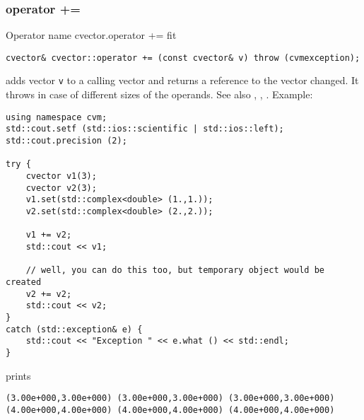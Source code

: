 \subsubsection{operator +=}
Operator%
\pdfdest name {cvector.operator +=} fit
\begin{verbatim}
cvector& cvector::operator += (const cvector& v) throw (cvmexception);
\end{verbatim}
adds vector \verb"v" to a calling vector 
and returns a reference to
the vector changed.
It throws  
in case of different sizes of the operands.
See also ,
,
.
Example:
\begin{Verbatim}
using namespace cvm;
std::cout.setf (std::ios::scientific | std::ios::left);
std::cout.precision (2);

try {
    cvector v1(3);
    cvector v2(3);
    v1.set(std::complex<double> (1.,1.));
    v2.set(std::complex<double> (2.,2.));

    v1 += v2;
    std::cout << v1;

    // well, you can do this too, but temporary object would be created
    v2 += v2;
    std::cout << v2;
}
catch (std::exception& e) {
    std::cout << "Exception " << e.what () << std::endl;
}
\end{Verbatim}
prints
\begin{Verbatim}
(3.00e+000,3.00e+000) (3.00e+000,3.00e+000) (3.00e+000,3.00e+000)
(4.00e+000,4.00e+000) (4.00e+000,4.00e+000) (4.00e+000,4.00e+000)
\end{Verbatim}
\newpage



